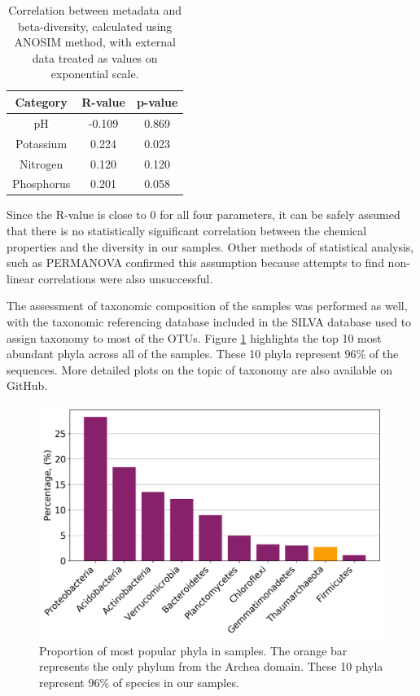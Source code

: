\documentclass[12pt,twocolumn]{article} %
\begin{document}
\begin{table}[ht!] %
	\begin{center}
		\label{tab:table_correlation}
		\begin{tabular}{c|c|c}
			\textbf{Category} & \textbf{R-value} & \textbf{p-value}\\
			\hline
			pH & -0.109 & 0.869\\
			Potassium & 0.224 & 0.023\\
			Nitrogen & 0.120 & 0.120 \\
			Phosphorus & 0.201 & 0.058\\
		\end{tabular}
		\caption{Correlation between metadata and beta-diversity, calculated using ANOSIM\cite{CLARKE1993} method, with external data treated as values on exponential scale.}
	\end{center}
\end{table}
\par
Since the R-value is close to 0 for all four parameters, it can be safely assumed that there is no statistically significant correlation between the chemical properties and the diversity in our samples. Other methods of statistical analysis, such as PERMANOVA\cite{Tang2016} confirmed this assumption because attempts to find non-linear correlations were also unsuccessful.
\par
The assessment of taxonomic composition of the samples was performed as well, with the taxonomic referencing database included in the SILVA database used to assign taxonomy to most of the OTUs. Figure \ref{fig:top_taxa} highlights the top 10 most abundant phyla across all of the samples. These 10 phyla represent 96\% of the sequences. More detailed plots on the topic of taxonomy are also available on GitHub\cite{Anonymous2018}.
\begin{figure}[ht!] %
	\includegraphics[width=\linewidth]{top_10.png}
	\caption{Proportion of most popular phyla in samples. The orange bar represents the only phylum from the Archea domain. These 10 phyla represent 96\% of species in our samples.}
	\label{fig:top_taxa}
\end{figure}
\end{document}
